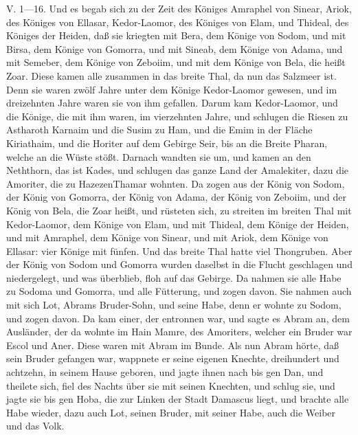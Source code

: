 \begin{schriftzitat}
V. 1—16. Und es begab sich zu der Zeit des Königes Amraphel von Sinear, Ariok, des Königes von Ellasar, Kedor-Laomor, des Königes von Elam, und Thideal, des Königes der Heiden, daß sie kriegten mit Bera, dem Könige von Sodom, und mit Birsa, dem Könige von Gomorra, und mit Sineab, dem Könige von Adama, und mit Semeber, dem Könige von Zeboiim, und mit dem Könige von Bela, die heißt Zoar. Diese kamen alle zusammen in das breite Thal, da nun das Salzmeer ist. Denn sie waren zwölf Jahre unter dem Könige Kedor-Laomor gewesen, und im dreizehnten Jahre waren sie von ihm gefallen. Darum kam Kedor-Laomor, und die Könige, die mit ihm waren, im vierzehnten Jahre, und schlugen die Riesen zu Astharoth Karnaim und die Susim zu Ham, und die Emim in der Fläche Kiriathaim, und die Horiter auf dem Gebirge Seir, bis an die Breite Pharan, welche an die Wüste stößt. Darnach wandten sie um, und kamen an den Neththorn, das ist Kades, und schlugen das ganze Land der Amalekiter, dazu die Amoriter, die zu HazezenThamar wohnten. Da zogen aus der König von Sodom, der König von Gomorra, der König von Adama, der König von Zeboiim, und der König von Bela, die Zoar heißt, und rüsteten sich, zu streiten im breiten Thal mit Kedor-Laomor, dem Könige von Elam, und mit Thideal, dem Könige der Heiden, und mit Amraphel, dem Könige von Sinear, und mit Ariok, dem Könige von Ellasar: vier Könige mit fünfen. Und das breite Thal hatte viel Thongruben. Aber der König von Sodom und Gomorra wurden daselbst in die Flucht geschlagen und niedergelegt, und was überblieb, floh auf das Gebirge. Da nahmen sie alle Habe zu Sodoma und Gomorra, und alle Fütterung, und zogen davon. Sie nahmen auch mit sich Lot, Abrams Bruder-Sohn, und seine Habe, denn er wohnte zu Sodom, und zogen davon. Da kam einer, der entronnen war, und sagte es Abram an, dem Ausländer, der da wohnte im Hain Mamre, des Amoriters, welcher ein Bruder war Escol und Aner. Diese waren mit Abram im Bunde. Als nun Abram hörte, daß sein Bruder gefangen war, wappnete er seine eigenen Knechte, dreihundert und achtzehn, in seinem Hause geboren, und jagte ihnen nach bis gen Dan, und theilete sich, fiel des Nachts über sie mit seinen Knechten, und schlug sie, und jagte sie bis gen Hoba, die zur Linken der Stadt Damascus liegt, und brachte alle Habe wieder, dazu auch Lot, seinen Bruder, mit seiner Habe, auch die Weiber und das Volk.
\end{schriftzitat}

